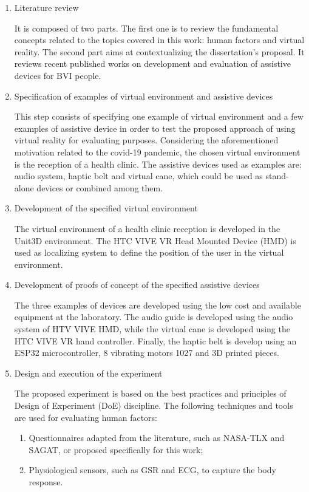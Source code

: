 \begin{enumerate}[leftmargin = 6em, label = Step \arabic* -- ]
    \item Literature review 
    
    It is composed of two parts. The first one is to review the fundamental concepts related to the topics covered in this work: human factors and virtual reality. The second part aims at contextualizing the dissertation’s proposal. It reviews recent published works on development and evaluation of assistive devices for BVI people.
    
    \item Specification of examples of virtual environment and assistive devices

    This step consists of specifying one example of virtual environment and a few examples of assistive device in order to test the proposed approach of using virtual reality for evaluating purposes. Considering the aforementioned motivation related to the covid-19 pandemic, the chosen virtual environment is the reception of a health clinic. The assistive devices used as examples are: audio system, haptic belt and virtual cane, which could be used as stand-alone devices or combined among them.
    
    \item Development of the specified virtual environment
    
    The virtual environment of a health clinic reception is developed in the Unit3D environment. The HTC VIVE VR Head Mounted Device (HMD) is used as localizing system to define the position of the user in the virtual environment.
    
    \item Development of proofs of concept of the specified assistive devices
    
    The three examples of devices are developed using the low cost and available equipment at the laboratory. The audio guide is developed using the audio system of HTV VIVE HMD, while the virtual cane is developed using the HTC VIVE VR hand controller. Finally, the haptic belt is develop using an ESP32 microcontroller, 8 vibrating motors 1027 and 3D printed pieces.
    
    \item Design and execution of the experiment
    
    The proposed experiment is based on the best practices and principles of Design of Experiment (DoE) discipline.
    The following techniques and tools are used for evaluating human factors:
    \begin{enumerate}[label = \alph*)]
        \item Questionnaires adapted from the literature, such as NASA-TLX and SAGAT, or proposed specifically for this work;
        \item Physiological sensors, such as GSR and ECG, to capture the body response.
    \end{enumerate}
    

\end{enumerate}
